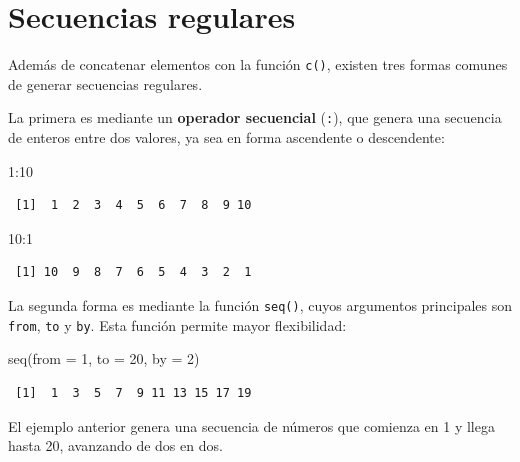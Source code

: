 \documentclass[
  spanish,
  letterpaper,
  DIV=11,
  numbers=noendperiod]{scrreprt}
\newenvironment{Shaded}{\begin{snugshade}}{\end{snugshade}}
\newcommand{\AttributeTok}[1]{\textcolor[rgb]{0.40,0.45,0.13}{#1}}
\newcommand{\DecValTok}[1]{\textcolor[rgb]{0.68,0.00,0.00}{#1}}
\newcommand{\FunctionTok}[1]{\textcolor[rgb]{0.28,0.35,0.67}{#1}}
\newcommand{\NormalTok}[1]{\textcolor[rgb]{0.00,0.23,0.31}{#1}}
\newcommand{\SpecialCharTok}[1]{\textcolor[rgb]{0.37,0.37,0.37}{#1}}
\begin{document}
\section{Secuencias regulares}\label{secuencias-regulares}

Además de concatenar elementos con la función \texttt{c()}, existen tres
formas comunes de generar secuencias regulares.

La primera es mediante un \textbf{operador secuencial} (\texttt{:}), que
genera una secuencia de enteros entre dos valores, ya sea en forma
ascendente o descendente:

\begin{Shaded}
\begin{Highlighting}[]
\DecValTok{1}\SpecialCharTok{:}\DecValTok{10}
\end{Highlighting}
\end{Shaded}

\begin{verbatim}
 [1]  1  2  3  4  5  6  7  8  9 10
\end{verbatim}

\begin{Shaded}
\begin{Highlighting}[]
\DecValTok{10}\SpecialCharTok{:}\DecValTok{1}
\end{Highlighting}
\end{Shaded}

\begin{verbatim}
 [1] 10  9  8  7  6  5  4  3  2  1
\end{verbatim}

La segunda forma es mediante la función \texttt{seq()}, cuyos argumentos
principales son \texttt{from}, \texttt{to} y \texttt{by}. Esta función
permite mayor flexibilidad:

\begin{Shaded}
\begin{Highlighting}[]
\FunctionTok{seq}\NormalTok{(}\AttributeTok{from =} \DecValTok{1}\NormalTok{, }\AttributeTok{to =} \DecValTok{20}\NormalTok{, }\AttributeTok{by =} \DecValTok{2}\NormalTok{)}
\end{Highlighting}
\end{Shaded}

\begin{verbatim}
 [1]  1  3  5  7  9 11 13 15 17 19
\end{verbatim}

El ejemplo anterior genera una secuencia de números que comienza en 1 y
llega hasta 20, avanzando de dos en dos.
\end{document}
